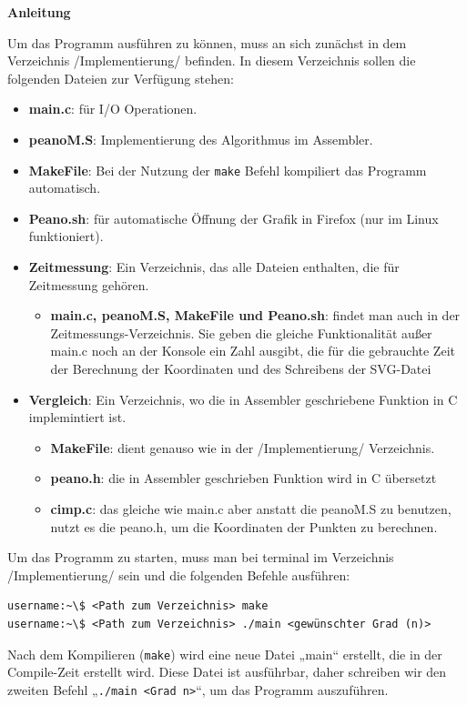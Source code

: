 \documentclass[course=erap]{aspdoc}
\begin{document}
\large\textbf{Anleitung}\newline

Um das Programm ausführen zu können, muss an sich zunächst in dem Verzeichnis /Implementierung/ befinden. In diesem Verzeichnis sollen die folgenden Dateien zur Verfügung stehen:
\begin{itemize}
    \item \textbf{main.c}: für I/O Operationen.
    \item \textbf{peanoM.S}: Implementierung des Algorithmus im Assembler.
    \item \textbf{MakeFile}: Bei der Nutzung der \texttt{make} Befehl kompiliert das Programm automatisch.
    \item \textbf{Peano.sh}: für automatische Öffnung der Grafik in Firefox (nur im Linux funktioniert).
    \item \textbf{Zeitmessung}: Ein Verzeichnis, das alle Dateien enthalten, die für Zeitmessung gehören.     \begin{itemize}
            \item \textbf{main.c, peanoM.S, MakeFile und Peano.sh}: findet man auch in der Zeitmessungs-Verzeichnis. Sie geben die gleiche Funktionalität außer main.c noch an der Konsole ein Zahl ausgibt, die für die gebrauchte Zeit der Berechnung der Koordinaten und des Schreibens der SVG-Datei   
        \end{itemize}
    \item \textbf{Vergleich}: Ein Verzeichnis, wo die in Assembler geschriebene Funktion in C implemintiert ist.
        \begin{itemize}
        \item \textbf{MakeFile}: dient genauso wie in der /Implementierung/ Verzeichnis.
        \item \textbf{peano.h}: die in Assembler geschrieben Funktion wird in C übersetzt
        \item \textbf{cimp.c}: das gleiche wie main.c aber anstatt die peanoM.S zu benutzen, nutzt es die peano.h, um die Koordinaten der Punkten zu berechnen. 
        \end{itemize}
\end{itemize}
Um das Programm zu starten, muss man bei terminal im Verzeichnis /Implementierung/ sein und die folgenden Befehle ausführen:
 \begin{verbatim}
username:~\$ <Path zum Verzeichnis> make
username:~\$ <Path zum Verzeichnis> ./main <gewünschter Grad (n)>
    \end{verbatim}
Nach dem Kompilieren (\texttt{make}) wird eine neue Datei „main“ erstellt, die in der Compile-Zeit erstellt wird. Diese Datei ist ausführbar, daher schreiben wir den zweiten Befehl „\texttt{./main <Grad n>}“, um das Programm auszuführen.
\end{document}
